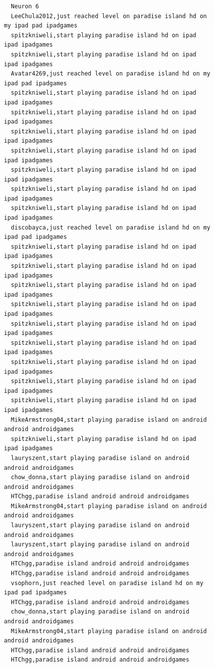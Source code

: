 \begin{figure}[htpb]
\begin{verbatim}
  Neuron 6
  LeeChula2012,just reached level on paradise island hd on my ipad pad ipadgames
  spitzkniweli,start playing paradise island hd on ipad ipad ipadgames
  spitzkniweli,start playing paradise island hd on ipad ipad ipadgames
  Avatar4269,just reached level on paradise island hd on my ipad pad ipadgames
  spitzkniweli,start playing paradise island hd on ipad ipad ipadgames
  spitzkniweli,start playing paradise island hd on ipad ipad ipadgames
  spitzkniweli,start playing paradise island hd on ipad ipad ipadgames
  spitzkniweli,start playing paradise island hd on ipad ipad ipadgames
  spitzkniweli,start playing paradise island hd on ipad ipad ipadgames
  spitzkniweli,start playing paradise island hd on ipad ipad ipadgames
  spitzkniweli,start playing paradise island hd on ipad ipad ipadgames
  discobayca,just reached level on paradise island hd on my ipad pad ipadgames
  spitzkniweli,start playing paradise island hd on ipad ipad ipadgames
  spitzkniweli,start playing paradise island hd on ipad ipad ipadgames
  spitzkniweli,start playing paradise island hd on ipad ipad ipadgames
  spitzkniweli,start playing paradise island hd on ipad ipad ipadgames
  spitzkniweli,start playing paradise island hd on ipad ipad ipadgames
  spitzkniweli,start playing paradise island hd on ipad ipad ipadgames
  spitzkniweli,start playing paradise island hd on ipad ipad ipadgames
  spitzkniweli,start playing paradise island hd on ipad ipad ipadgames
  spitzkniweli,start playing paradise island hd on ipad ipad ipadgames
  MikeArmstrong04,start playing paradise island on android android androidgames
  spitzkniweli,start playing paradise island hd on ipad ipad ipadgames
  lauryszent,start playing paradise island on android android androidgames
  chow_donna,start playing paradise island on android android androidgames
  HTChgg,paradise island android android androidgames
  MikeArmstrong04,start playing paradise island on android android androidgames
  lauryszent,start playing paradise island on android android androidgames
  lauryszent,start playing paradise island on android android androidgames
  HTChgg,paradise island android android androidgames
  HTChgg,paradise island android android androidgames
  vsophorn,just reached level on paradise island hd on my ipad pad ipadgames
  HTChgg,paradise island android android androidgames
  chow_donna,start playing paradise island on android android androidgames
  MikeArmstrong04,start playing paradise island on android android androidgames
  HTChgg,paradise island android android androidgames
  HTChgg,paradise island android android androidgames

\end{verbatim}
\end{figure}
